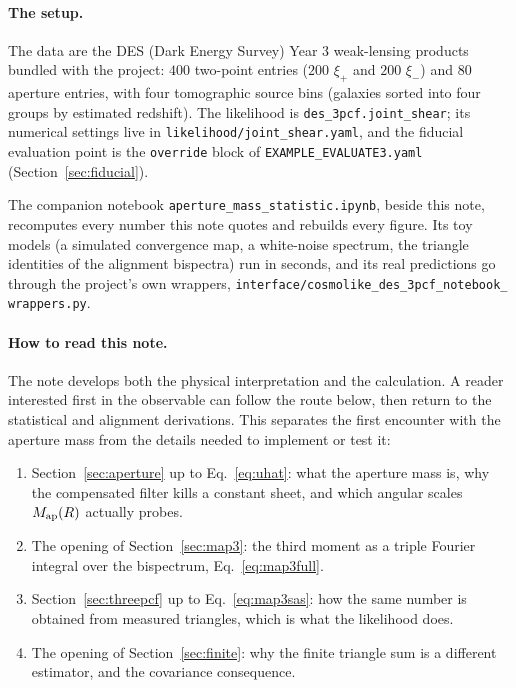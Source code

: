 \documentclass[11pt]{article}
\newcommand{\Map}{M_{\rm ap}}
\newcommand{\us}{\_\allowbreak}
\numberwithin{equation}{section}
\begin{document}
\paragraph{The setup.}
The data are the DES (Dark Energy Survey) Year 3 weak-lensing
products bundled with the project: $400$ two-point entries
($200$ $\xi_+$ and $200$ $\xi_-$) and $80$ aperture entries, with
four tomographic source bins (galaxies sorted into four groups by
estimated redshift).  The likelihood is
\texttt{des\us 3pcf.joint\us shear}; its numerical settings live in
\texttt{likelihood/joint\us shear.yaml}, and the fiducial evaluation
point is the \texttt{override} block of
\texttt{EXAMPLE\us EVALUATE3.yaml} (Section~\ref{sec:fiducial}).

The companion notebook \texttt{aperture\us mass\us statistic.ipynb},
beside this note, recomputes every number this note quotes and
rebuilds every figure.  Its toy models (a simulated convergence map, a
white-noise spectrum, the triangle identities of the alignment
bispectra) run in seconds, and its real predictions go through the
project's own wrappers,
\texttt{interface/cosmolike\us des\us 3pcf\us notebook\us
wrappers.py}.

\paragraph{How to read this note.}
The note develops both the physical interpretation and the calculation.
A reader interested first in the observable can follow the route below,
then return to the statistical and alignment derivations. This separates
the first encounter with the aperture mass from the details needed to
implement or test it:
\begin{enumerate}
  \item Section~\ref{sec:aperture} up to
    Eq.~\eqref{eq:uhat}: what the aperture mass is, why the
    compensated filter kills a constant sheet, and which angular
    scales $\Map(R)$ actually probes.
  \item The opening of Section~\ref{sec:map3}: the third moment as a
    triple Fourier integral over the bispectrum,
    Eq.~\eqref{eq:map3full}.
  \item Section~\ref{sec:threepcf} up to Eq.~\eqref{eq:map3sas}: how
    the same number is obtained from measured triangles, which is
    what the likelihood does.
  \item The opening of Section~\ref{sec:finite}: why the finite
    triangle sum is a different estimator, and the covariance
    consequence.
\end{enumerate}
\end{document}
